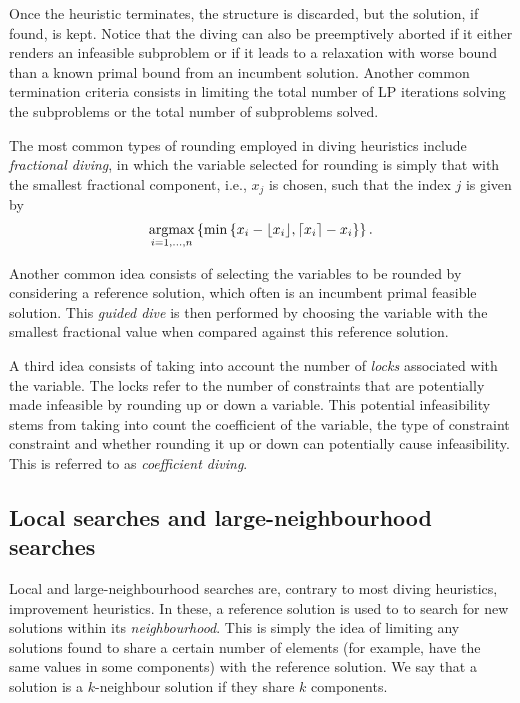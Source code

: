 Once the heuristic terminates, the structure is discarded, but the solution, if found, is kept. Notice that the diving can also be preemptively aborted if it either renders an infeasible subproblem or if it leads to a relaxation with worse bound than a known primal bound from an incumbent solution. Another common termination criteria consists in limiting the total number of LP iterations solving the subproblems or the total number of subproblems solved. 

The most common types of rounding employed in diving heuristics include \emph{fractional diving}, in which the variable selected for rounding is simply that with the smallest fractional component, i.e., $x_j$ is chosen, such that the index $j$ is given by
%
\begin{equation*}
	\mathop{\rm argmax}_{i=1,\dots,n} \left\{ \min\left\{ x_i-\lfloor x_i\rfloor, \lceil x_i \rceil - x_i \right \} \right \}.	
\end{equation*}

Another common idea consists of selecting the variables to be rounded by considering a reference solution, which often is an incumbent primal feasible solution. This \emph{guided dive} is then performed by choosing the variable with the smallest fractional value when compared against this reference solution. 

A third idea consists of taking into account the number of \emph{locks} associated with the variable. The locks refer to the number of constraints that are potentially made infeasible by rounding up or down a variable. This potential infeasibility stems from taking into count the coefficient of the variable, the type of constraint constraint and whether rounding it up or down can potentially cause infeasibility. This is referred to as \emph{coefficient diving}.


\subsection{Local searches and large-neighbourhood searches}

Local and large-neighbourhood searches are, contrary to most diving heuristics, improvement heuristics. In these, a reference solution is used to to search for new solutions within its \emph{neighbourhood}. This is simply the idea of limiting any solutions found to share a certain number of elements (for example, have the same values in some components) with the reference solution. We say that a solution is a $k$-neighbour solution if they share $k$ components.

